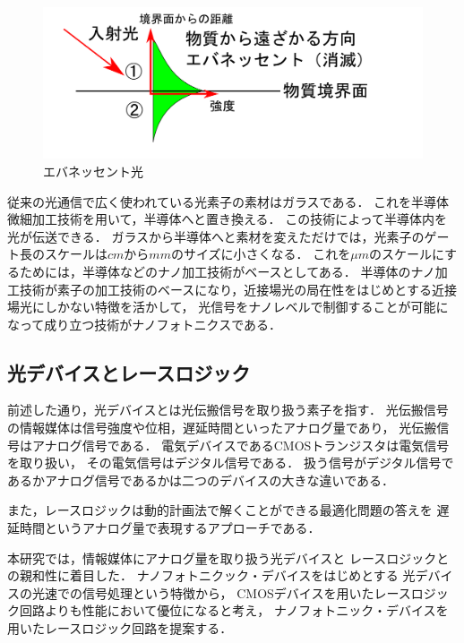 \begin{figure}[t!]
\begin{center}
\includegraphics[keepaspectratio,scale=0.4]{fig/3/evanesent2.pdf}
\caption{エバネッセント光}
\label{fig:eva2}
\end{center}
\end{figure}
従来の光通信で広く使われている光素子の素材はガラスである．
これを半導体微細加工技術を用いて，半導体へと置き換える．
この技術によって半導体内を光が伝送できる．
ガラスから半導体へと素材を変えただけでは，光素子のゲート長のスケールは$cmからmm$のサイズに小さくなる．
これを$ \mu m$のスケールにするためには，半導体などのナノ加工技術がベースとしてある．
半導体のナノ加工技術が素子の加工技術のベースになり，近接場光の局在性をはじめとする近接場光にしかない特徴を活かして，
光信号をナノレベルで制御することが可能になって成り立つ技術がナノフォトニクスである．

\subsection{光デバイスとレースロジック}
前述した通り，光デバイスとは光伝搬信号を取り扱う素子を指す．
光伝搬信号の情報媒体は信号強度や位相，遅延時間といったアナログ量であり，
光伝搬信号はアナログ信号である．
電気デバイスであるCMOSトランジスタは電気信号を取り扱い，
その電気信号はデジタル信号である．
扱う信号がデジタル信号であるかアナログ信号であるかは二つのデバイスの大きな違いである．

また，レースロジックは動的計画法で解くことができる最適化問題の答えを
遅延時間というアナログ量で表現するアプローチである．

本研究では，情報媒体にアナログ量を取り扱う光デバイスと
レースロジックとの親和性に着目した．
ナノフォトニクック・デバイスをはじめとする
光デバイスの光速での信号処理という特徴から，
CMOSデバイスを用いたレースロジック回路よりも性能において優位になると考え，
ナノフォトニック・デバイスを用いたレースロジック回路を提案する．

